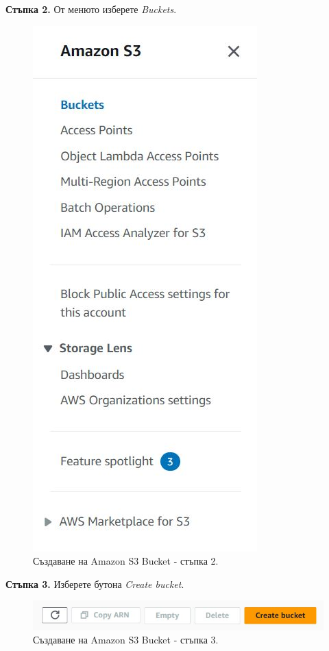 \documentclass[12pt]{article}
\begin{document}
\noindent\textbf{Стъпка 2.} От менюто изберете \textit{Buckets}.
\begin{figure}[h!]
\centering
    \includegraphics[scale=0.55]{instructions/s3/2.JPG}
  \caption{Създаване на Amazon S3 Bucket - стъпка 2.}
\end{figure}

\noindent\textbf{Стъпка 3.} Изберете бутона \textit{Create bucket}.
\begin{figure}[h!]
\centering
    \includegraphics[scale=0.6]{instructions/s3/3.JPG}
  \caption{Създаване на Amazon S3 Bucket - стъпка 3.}
\end{figure}
\end{document}
